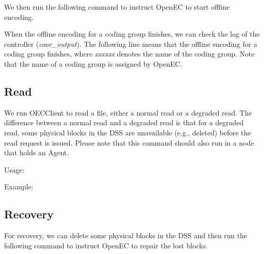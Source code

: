 \documentclass[letterpaper,12pt]{article}
\newcommand{\openec}{{\sf\small OpenEC}\xspace}
\begin{document}
We then run the following command to instruct \openec to start offline
encoding.

\begin{center}
\noindent{}
\end{center}

When the offline encoding for a coding group finishes, we can check the log of
the controller ({\sl coor\_output}).  The following line means that the
offline encoding for a coding group finishes, where {\sl xxxxxx} denotes the
name of the coding group. Note that the name of a coding group is assigned by
\openec.

\begin{center}
\noindent{}
\end{center}


\subsection{Read}

We run OECClient to read a file, either a normal read or a degraded read. 
The difference between a normal read and a degraded read is that for a
degraded read, some physical blocks in the DSS are unavailable (e.g., deleted)
before the read request is issued.  Please note that this command should also
run in a node that holds an Agent.

Usage:
\begin{center}
\noindent{}
\end{center}

Example:
\begin{center}
\noindent{}
\end{center}

\subsection{Recovery}

For recovery, we can delete some physical blocks in the DSS and then run the
following command to instruct \openec to repair the lost blocks.

\begin{center}
\noindent{}
\end{center}
\end{document}
